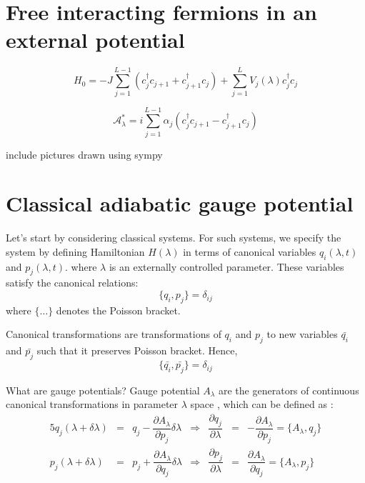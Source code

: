 \documentclass[11pt,a4paper]{article}
\begin{document}
\section{Free interacting fermions in an external potential}

\begin{equation}
H_0= -J \sum_{j=1}^{L-1} (c^{\dagger}_j c_{j+1} +c^{\dagger}_{j+1} c_{j}) + \sum_{j=1}^{L} V_j(\lambda) c^{\dagger}_jc_j
\end{equation}


\begin{equation}
\mathcal{A}^*_{\lambda}= i  \sum_{j=1}^{L-1} \alpha_j (c^{\dagger}_j c_{j+1} - c^{\dagger}_{j+1} c_{j}) 
\end{equation}

include pictures drawn using sympy


\section{Classical adiabatic gauge potential}
Let's start by considering classical systems. For such systems, we specify the system by defining Hamiltonian $H (\lambda)$ in terms of canonical variables $q_i (\lambda,t)$ and $p_j (\lambda,t)$. where $\lambda$ is an externally controlled parameter. These variables satisfy the canonical relations:
\begin{equation}
\{q_i,p_j \}=\delta_{ij} 
\end{equation}
where $\{\ldots \}$ denotes the Poisson bracket.

Canonical transformations are transformations of $q_i$ and $p_j$ to new variables $\bar{q_i}$ and $\bar{p_j}$ such that it preserves Poisson bracket. Hence, 
\begin{equation}
\{\bar{q_i},\bar{p_j} \}=\delta_{ij} 
\end{equation}

What are gauge potentials? Gauge potential $A_{\lambda}$  are the generators of continuous canonical transformations in parameter $\lambda$ space , which can be defined as :
\begin{alignat}{5}
q_j(\lambda + \delta \lambda) & =& q_j - \dfrac{\partial A_{\lambda}}{\partial p_j} \delta \lambda &\Rightarrow & \dfrac{\partial q_j}{\partial \lambda} &=& -\dfrac{\partial A_{\lambda}}{\partial p_j} = \{A_{\lambda},q_j \} \\
p_j(\lambda + \delta \lambda) & =& p_j + \dfrac{\partial A_{\lambda}}{\partial q_j} \delta \lambda & \Rightarrow & \dfrac{\partial p_j}{\partial \lambda} &=& \dfrac{\partial A_{\lambda}}{\partial q_j}=\{ A_{\lambda},p_j \}
\label{def_A}
\end{alignat}
\end{document}
